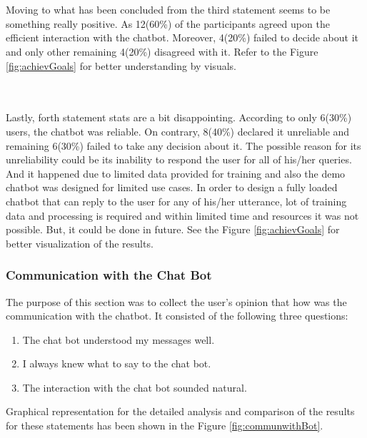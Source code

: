 \\~\\
Moving to what has been concluded from the third statement seems to be something really positive. As 12(60\%) of the participants agreed upon the efficient interaction with the chatbot. Moreover, 4(20\%) failed to decide about it and only other remaining 4(20\%) disagreed with it. Refer to the Figure \ref{fig:achievGoals} for better understanding by visuals.

\\~\\
Lastly, forth statement stats are a bit disappointing. According to only 6(30\%) users, the chatbot was reliable. On contrary, 8(40\%) declared it unreliable and remaining 6(30\%) failed to take any decision about it. The possible reason for its unreliability could be its inability to respond the user for all of his/her queries. And it happened due to limited data provided for training and also the demo chatbot was designed for limited use cases. In order to design a fully loaded chatbot that can reply to the user for any of his/her utterance, lot of training data and processing is required and within limited time and resources it was not possible. But, it could be done in future. See the Figure \ref{fig:achievGoals} for better visualization of the results.


\subsubsection*{Communication with the Chat Bot}
The purpose of this section was to collect the user's opinion that how was the communication with the chatbot. It consisted of the following three questions:
\begin{enumerate}
    \item The chat bot understood my messages well.
    \item I always knew what to say to the chat bot.
    \item The interaction with the chat bot sounded natural.
\end{enumerate}
Graphical representation for the detailed analysis and comparison of the results for these statements has been shown in the Figure \ref{fig:communwithBot}.

